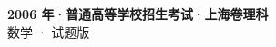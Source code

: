 \documentclass[zihao=-4, a4paper]{ctexart}
\begin{document}
\begin{center}
  {\Large\bfseries 2006 年·普通高等学校招生考试·上海卷理科}\\[4pt]
  {\large 数学 · 试题版}
\end{center}
\medskip
{}

\end{document}

